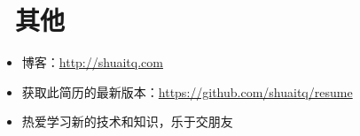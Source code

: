 \documentclass{resume}
\begin{document}
\section{\texorpdfstring{\faInfo\ 其他}{其他}}
\begin{itemize}[parsep=0.5ex]
  \item 博客：\url{http://shuaitq.com}
  \item 获取此简历的最新版本：\url{https://github.com/shuaitq/resume}
  \item 热爱学习新的技术和知识，乐于交朋友
\end{itemize}

%
%
\end{document}

